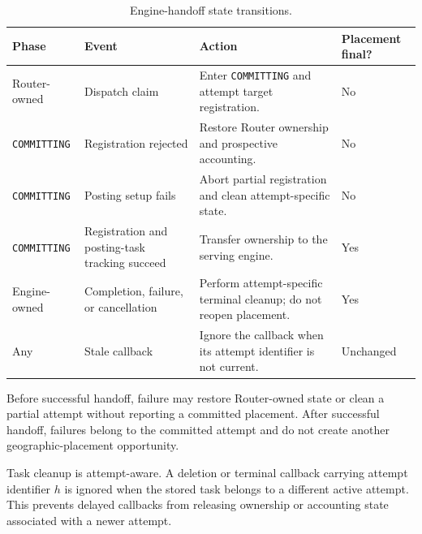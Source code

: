 \documentclass[letterpaper,twocolumn,10pt]{article}
\begin{document}
\begin{table}[t]
    \centering
    \small
    \caption{Engine-handoff state transitions.}
    \label{tab:appendix:handoff-state-machine}
    \begin{tabular}{
        p{}
        p{}
        p{}
        p{}}
        \toprule
        \textbf{Phase} &
        \textbf{Event} &
        \textbf{Action} &
        \textbf{Placement final?} \\
        \midrule

        Router-owned &
        Dispatch claim &
        Enter \texttt{COMMITTING} and attempt target registration. &
        No \\

        \texttt{COMMITTING} &
        Registration rejected &
        Restore Router ownership and prospective accounting. &
        No \\

        \texttt{COMMITTING} &
        Posting setup fails &
        Abort partial registration and clean attempt-specific state. &
        No \\

        \texttt{COMMITTING} &
        Registration and posting-task tracking succeed &
        Transfer ownership to the serving engine. &
        Yes \\

        Engine-owned &
        Completion, failure, or cancellation &
        Perform attempt-specific terminal cleanup; do not reopen placement. &
        Yes \\

        Any &
        Stale callback &
        Ignore the callback when its attempt identifier is not current. &
        Unchanged \\

        \bottomrule
    \end{tabular}
\end{table}

Before successful handoff, failure may restore Router-owned state or clean a
partial attempt without reporting a committed placement.
After successful handoff, failures belong to the committed attempt and do not
create another geographic-placement opportunity.

Task cleanup is attempt-aware.
A deletion or terminal callback carrying attempt identifier $h$ is ignored
when the stored task belongs to a different active attempt.
This prevents delayed callbacks from releasing ownership or accounting state
associated with a newer attempt.
\end{document}
